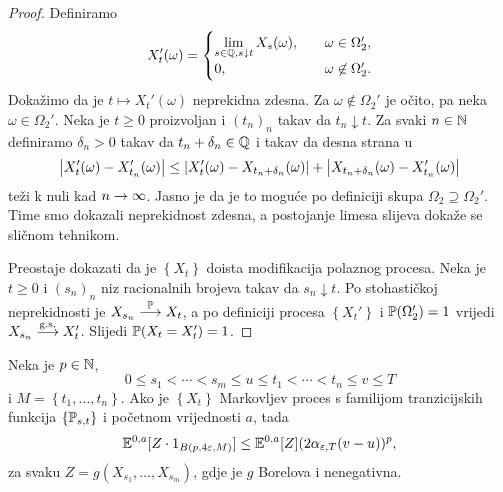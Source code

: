 \documentclass[main.tex]{subfiles}
\begin{document}
\begin{proof}
	Definiramo
	\begin{equation} X_t'(\omega) =
		\begin{cases}
			\lim\limits_{s \in \Q, s \downarrow t}  X_s(\omega), \quad & \omega \in \Omega_2',      \\
			0, \quad                                                   & \omega \not \in \Omega_2'.
		\end{cases}
	\end{equation}
	Dokažimo da je \( t \mapsto X_t'(\omega) \) neprekidna zdesna. Za \( \omega \not \in \Omega_2' \) je očito, pa neka
	\( \omega \in \Omega_2' \). Neka je \( t \ge 0 \) proizvoljan i \( (t_n)_n \) takav da \( t_n \downarrow t \). Za svaki \( n \in \N \)
	definiramo \( \delta_n > 0 \) takav da \( t_n + \delta_n \in \Q \) i takav da desna strana u
	\begin{equation}
		\abs{X'_t(\omega) - X'_{t_n}(\omega)} \le \abs{X'_t(\omega) - X_{t_n+\delta_n}(\omega)} + \abs{X_{t_n+\delta_n}(\omega) - X'_{t_n}(\omega)}
	\end{equation}
	teži k nuli kad \( n \ub \). Jasno je da je to moguće po definiciji skupa \( \Omega_2 \supseteq \Omega_2' \). Time smo dokazali neprekidnost zdesna,
	a postojanje limesa slijeva dokaže se sličnom tehnikom.

	Preostaje dokazati da je \( \left\{ X_t \right\} \) doista modifikacija polaznog procesa. Neka je \( t \ge 0 \) i \( (s_n)_n \) niz racionalnih brojeva
	takav da \( s_n \downarrow t \). Po stohastičkoj neprekidnosti je \( X_{s_n} \konvp X_t \), a po definiciji procesa \( \left\{ X_t' \right\} \) i \( \P(\Omega_2')=1 \) vrijedi
	\( X_{s_n} \konvgs X_t' \). Slijedi \( \P(X_t=X_t')=1 \).
\end{proof}

\begin{lema}\label{markovlema3}
	Neka je \( p \in \N \),
	\[
		0 \le s_1 < \cdots < s_m \le u \le t_1 < \cdots < t_n \le v \le T
	\]
	i \( M = \left\{ t_1, \ldots, t_n \right\} \). Ako je \( \left\{ X_t \right\} \) Markovljev proces
	s familijom tranzicijskih funkcija \( \left\{ \Ptrans_{s,t} \right\} \) i početnom vrijednosti \( a \), tada
	\begin{equation}
		\E^{0,a}[Z \cdot 1_{B(p, 4\varepsilon, M)}] \le \E^{0,a}[Z](2\alpha_{\varepsilon, T}(v-u))^p,
	\end{equation}
	za svaku \( Z = g(X_{s_1},\ldots,X_{s_m}) \), gdje je \( g \) Borelova i nenegativna.
\end{lema}
\end{document}
